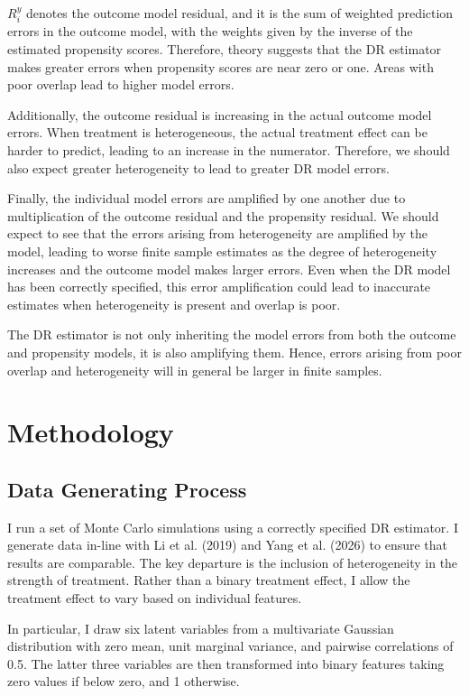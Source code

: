 \documentclass[12pt, oneside]{article}   	%
\begin{document}
$R_{i}^{y}$ denotes the outcome model residual, and it is the sum of weighted prediction errors in the outcome model, with the weights given by the inverse of the estimated propensity scores. Therefore, theory suggests that the DR estimator makes greater errors when propensity scores are near zero or one. Areas with poor overlap lead to higher model errors.

Additionally, the outcome residual is increasing in the actual outcome model errors. When treatment is heterogeneous, the actual treatment effect can be harder to predict, leading to an increase in the numerator. Therefore, we should also expect greater heterogeneity to lead to greater DR model errors.

Finally, the individual model errors are amplified by one another due to multiplication of the outcome residual and the propensity residual. We should expect to see that the errors arising from heterogeneity are amplified by the model, leading to worse finite sample estimates as the degree of heterogeneity increases and the outcome model makes larger errors. Even when the DR model has been correctly specified, this error amplification could lead to inaccurate estimates when heterogeneity is present and overlap is poor.

The DR estimator is not only inheriting the model errors from both the outcome and propensity models, it is also amplifying them. Hence, errors arising from poor overlap and heterogeneity will in general be larger in finite samples.


\section{Methodology}

\subsection{Data Generating Process}
I run a set of Monte Carlo simulations using a correctly specified DR estimator. I generate data in-line with Li et al. (2019) and Yang et al. (2026) to ensure that results are comparable. The key departure is the inclusion of heterogeneity in the strength of treatment. Rather than a binary treatment effect, I allow the treatment effect to vary based on individual features.

In particular, I draw six latent variables from a multivariate Gaussian distribution with zero mean, unit marginal variance, and pairwise correlations of 0.5. The latter three variables are then transformed into binary features taking zero values if below zero, and 1 otherwise.
\end{document}
